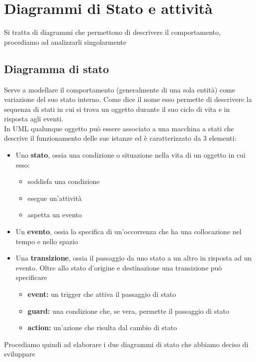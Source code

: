 \documentclass[a4paper, 11pt,oneside]{book}
\begin{document}
\chapter{Diagrammi di Stato e attività}
    Si tratta di diagrammi che permettono di descrivere il comportamento, procediamo ad analizzarli singolarmente
    \section{Diagramma di stato}
        Serve a modellare il comportamento (generalmente di una sola entità) come variazione del suo stato interno. Come dice il nome esso permette di descrivere la sequenza di stati in cui si trova un oggetto durante il suo
        ciclo di vita e in risposta agli eventi.\\
        In UML qualunque oggetto può essere associato a una macchina a stati che descrive il funzionamento delle sue istanze ed è caratterizzato da 3 elementi:
        \begin{itemize}
            \item Uno \textbf{stato}, ossia una condizione o situazione nella vita di un oggetto in cui esso:
            \begin{itemize}
                \item soddisfa una condizione
                \item esegue un'attività
                \item aspetta un evento
            \end{itemize}
            \item Un \textbf{evento}, ossia la specifica di un'occorrenza che ha una collocazione nel tempo e nello spazio
            \item Una \textbf{transizione}, ossia il passaggio da uno stato a un altro in risposta ad un evento. Oltre allo stato d'origine e destinazione una transizione può specificare
            \begin{itemize}
                \item \textbf{event:} un trigger che attiva il passaggio di stato
                \item \textbf{guard:} una condizione che, se vera, permette il passaggio di stato
                \item \textbf{action:} un'azione che risulta dal cambio di stato
            \end{itemize}
        \end{itemize}
        Procediamo quindi ad elaborare i due diagrammi di stato che abbiamo deciso di sviluppare
\end{document}
